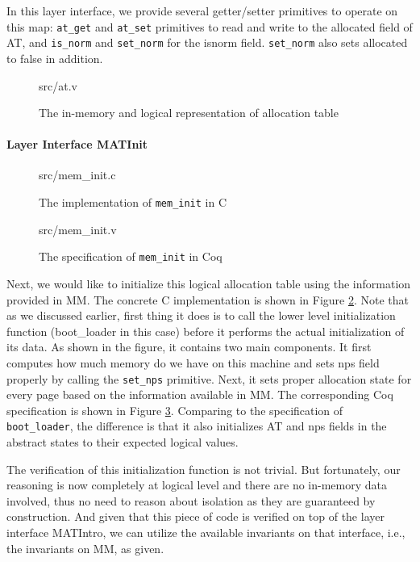 In this layer interface, we provide several getter/setter primitives to operate on this map:
\texttt{at\_get} and \texttt{at\_set} primitives to read and write to the \textsf{allocated} field of \textsf{AT},
and \texttt{is\_norm} and \texttt{set\_norm} for the \textsf{isnorm} field. \texttt{set\_norm} also sets \textsf{allocated}
to \textsf{false} in addition.


\begin{figure}
	 {src/at.v}
	\caption{The in-memory and logical representation of allocation table}
	\label{fig:at_v}
\end{figure}

\paragraph{Layer Interface MATInit}

\begin{figure}
	 {src/mem_init.c}
	\caption{The implementation of \texttt{mem\_init} in C}
	\label{fig:mem_init_c}
\end{figure}


\begin{figure}
	 {src/mem_init.v}
	\caption{The specification of \texttt{mem\_init} in Coq}
	\label{fig:mem_init_v}
\end{figure}

Next, we would like to initialize this logical allocation table using the information provided
in \textsf{MM}. The concrete C implementation is shown in Figure \ref{fig:mem_init_c}.
Note that as we discussed earlier, first thing it does is to call the lower level initialization
function (boot\_loader in this case) before it performs the actual initialization of its data.
As shown in the figure, it contains two main components. It first computes how much memory
do we have on this machine and sets \textsf{nps} field properly by calling the \texttt{set\_nps} primitive.
Next, it sets proper allocation state for every page based on the information available in \textsf{MM}.
The corresponding Coq specification is shown in Figure \ref{fig:mem_init_v}. 
Comparing to the specification of \texttt{boot\_loader}, the difference is that it also initializes
\textsf{AT} and \textsf{nps} fields in the abstract states to their expected logical values.

The verification of this initialization function is not trivial. But fortunately, our reasoning
is now completely at logical level and there are no in-memory data involved, thus no need
to reason about isolation as they are guaranteed by construction.
And given that this piece of code is verified on top of the layer interface MATIntro,
we can utilize the available invariants on that interface, i.e., the invariants on \textsf{MM}, as given.

